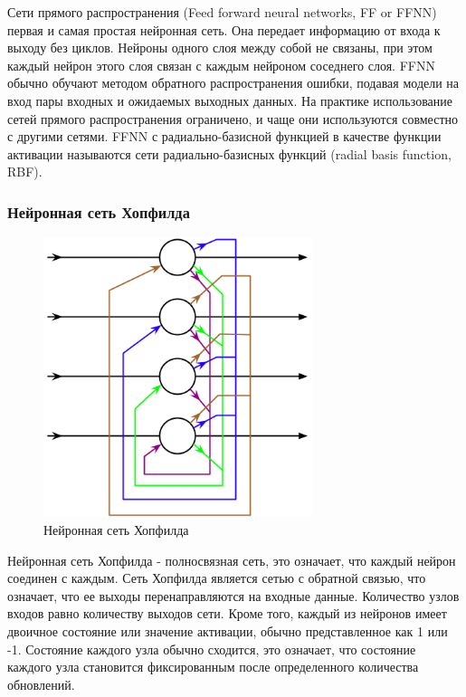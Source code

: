 Сети прямого распространения (Feed forward neural networks, FF or FFNN) первая и самая простая нейронная сеть. Она передает информацию от входа к выходу без циклов. Нейроны одного слоя между собой не связаны, при этом каждый нейрон этого слоя связан с каждым нейроном соседнего слоя. FFNN обычно обучают методом обратного распространения ошибки, подавая модели на вход пары входных и ожидаемых выходных данных. На практике использование сетей прямого распространения ограничено, и чаще они используются совместно с другими сетями.
FFNN с радиально-базисной функцией в качестве функции активации называются сети радиально-базисных функций (radial basis function, RBF).

\subsubsection{Нейронная сеть Хопфилда}
\begin{figure}[htbp]
\centering
\caption{Нейронная сеть Хопфилда}
\includegraphics[width=0.7\textwidth]{fig/Hopfield}
\end{figure}
Нейронная сеть Хопфилда - полносвязная сеть, это означает, что каждый нейрон соединен с каждым. Сеть Хопфилда является сетью с обратной связью, что означает, что ее выходы перенаправляются на входные данные. Количество узлов входов равно количеству выходов сети. Кроме того, каждый из нейронов имеет двоичное состояние или значение активации, обычно представленное как 1 или -1. Состояние каждого узла обычно сходится, это означает, что состояние каждого узла становится фиксированным после определенного количества обновлений.

